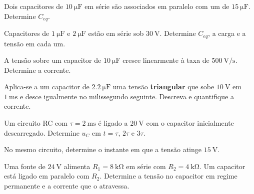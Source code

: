 \blocoaplicacao
\begin{questao}[2]{}

Dois capacitores de $\SI{10}{\micro\farad}$ em série são associados em paralelo
com um de $\SI{15}{\micro\farad}$. Determine $C_{eq}$.


\end{questao}
\begin{questao}[2]{}

Capacitores de $\SI{1}{\micro\farad}$ e $\SI{2}{\micro\farad}$ estão em série
sob $\SI{30}{\volt}$. Determine $C_{eq}$, a carga e a tensão em cada um.


\end{questao}
\begin{questao}[2]{}

A tensão sobre um capacitor de $\SI{10}{\micro\farad}$ cresce linearmente à
taxa de $\SI{500}{\volt\per\second}$. Determine a corrente.


\end{questao}
\begin{questao}[2]{}

Aplica-se a um capacitor de $\SI{2.2}{\micro\farad}$ uma tensão
\textbf{triangular} que sobe $\SI{10}{\volt}$ em $\SI{1}{\milli\second}$ e
desce igualmente no milissegundo seguinte. Descreva e quantifique a corrente.


\end{questao}
\begin{questao}[2]{}

Um circuito RC com $\tau=\SI{2}{\milli\second}$ é ligado a
$\SI{20}{\volt}$ com o capacitor inicialmente descarregado. Determine
$u_C$ em $t=\tau$, $2\tau$ e $3\tau$.


\end{questao}
\begin{questao}[2]{}

No mesmo circuito, determine o instante em que a tensão atinge
$\SI{15}{\volt}$.


\end{questao}
\begin{questao}[2]{}

Uma fonte de $\SI{24}{\volt}$ alimenta $R_1=\SI{8}{\kilo\ohm}$ em série com
$R_2=\SI{4}{\kilo\ohm}$. Um capacitor está ligado em paralelo com $R_2$.
Determine a tensão no capacitor em regime permanente e a corrente que o
atravessa.


\end{questao}
